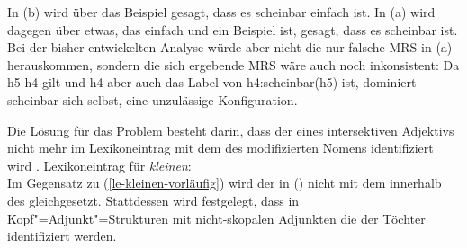 \noindent
In (b) wird über das Beispiel gesagt, dass es scheinbar einfach ist. In (a) wird
dagegen über etwas, das einfach und ein Beispiel ist, gesagt, dass es scheinbar ist. Bei der bisher
entwickelten Analyse würde aber nicht die nur falsche MRS in (a) herauskommen, sondern die
sich ergebende MRS wäre auch noch inkonsistent:
\ea
{}
\z
Da h5 \qeq h4 gilt und h4 aber auch das Label von h4:scheinbar(h5) ist, dominiert scheinbar sich
selbst, eine unzulässige Konfiguration.

Die Lösung für das Problem besteht darin, dass der \ltopw eines intersektiven Adjektivs nicht mehr
im Lexikoneintrag mit dem des modifizierten Nomens identifiziert wird \citep[Section~6.3]{CFPS2005a}. 
\eas
Lexikoneintrag für \emph{kleinen}:\\%
\zs
Im Gegensatz zu (\ref{le-kleinen-vorläufig}) wird der \ltopw in () nicht mit dem \ltopw innerhalb des \modwes gleichgesetzt.
Stattdessen wird festgelegt, dass in Kopf"=Adjunkt"=Strukturen mit nicht-skopalen Adjunkten die \ltopwe der Töchter identifiziert
werden. 
\ea
\label{ex-scopal-ltop}
 \impl
\flushright 
{}
\z
\medskip

